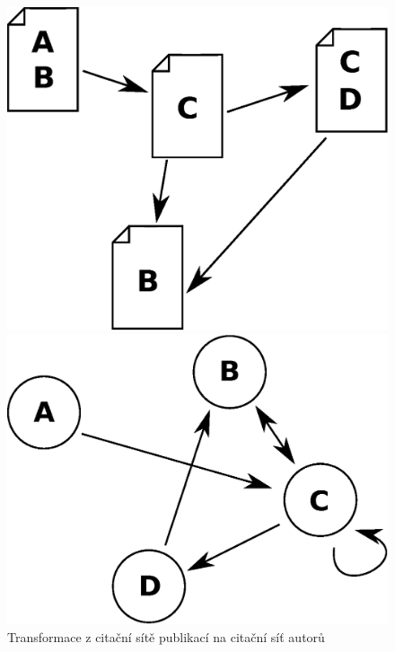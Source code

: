 \documentclass{bakalarka}
\begin{document}
\begin{figure}[!ht]
\begin{minipage}[b]{0.45\textwidth}
\centering
	\includegraphics[width=\textwidth]{pubs.eps}
\end{minipage}
\hspace{0.5cm}
\begin{minipage}[b]{0.45\textwidth}
\centering
	\includegraphics[width=\textwidth]{auths.eps}
\end{minipage}
\caption{Transformace z citační sítě publikací na citační síť autorů}
\label{fig:transform}
\end{figure}
\end{document}
